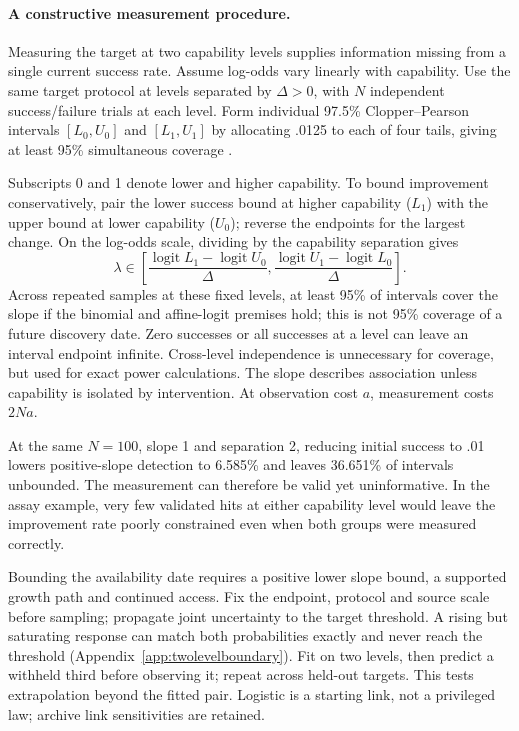 \paragraph{A constructive measurement procedure.}
Measuring the target at two capability levels supplies information missing from a single current success rate. Assume log-odds vary linearly with capability. Use the same target protocol at levels separated by $\Delta>0$, with $N$ independent success/failure trials at each level. Form individual 97.5\% Clopper--Pearson intervals $[L_0,U_0]$ and $[L_1,U_1]$ by allocating .0125 to each of four tails, giving at least 95\% simultaneous coverage \citep{clopper1934}.

Subscripts 0 and 1 denote lower and higher capability. To bound improvement conservatively, pair the lower success bound at higher capability ($L_1$) with the upper bound at lower capability ($U_0$); reverse the endpoints for the largest change. On the log-odds scale, dividing by the capability separation gives
\begin{equation}
 \lambda\in\left[\frac{\operatorname{logit}L_1-\operatorname{logit}U_0}{\Delta},
 \frac{\operatorname{logit}U_1-\operatorname{logit}L_0}{\Delta}\right].
 \label{eq:lambda_interval}
\end{equation}
Across repeated samples at these fixed levels, at least 95\% of intervals cover the slope if the binomial and affine-logit premises hold; this is not 95\% coverage of a future discovery date. Zero successes or all successes at a level can leave an interval endpoint infinite. Cross-level independence is unnecessary for coverage, but used for exact power calculations. The slope describes association unless capability is isolated by intervention. At observation cost $a$, measurement costs $2Na$.


At the same $N=100$, slope 1 and separation 2, reducing initial success to .01 lowers positive-slope detection to 6.585\% and leaves 36.651\% of intervals unbounded. The measurement can therefore be valid yet uninformative. In the assay example, very few validated hits at either capability level would leave the improvement rate poorly constrained even when both groups were measured correctly.

Bounding the availability date requires a positive lower slope bound, a supported growth path and continued access. Fix the endpoint, protocol and source scale before sampling; propagate joint uncertainty to the target threshold. A rising but saturating response can match both probabilities exactly and never reach the threshold (Appendix~\ref{app:twolevelboundary}). Fit on two levels, then predict a withheld third before observing it; repeat across held-out targets. This tests extrapolation beyond the fitted pair. Logistic is a starting link, not a privileged law; archive link sensitivities are retained.

